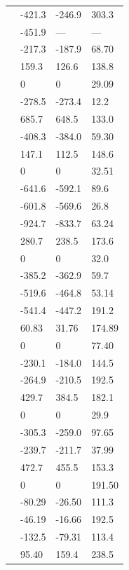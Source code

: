 \begin{supertabular}{llll}
     & -421.3 & -246.9 & 303.3 \\
     & -451.9 & --- & --- \\
     & -217.3 & -187.9 & 68.70 \\
     & 159.3 & 126.6 & 138.8 \\
     & 0 & 0 & 29.09 \\
     & -278.5 & -273.4 & 12.2 \\
     & 685.7 & 648.5 & 133.0 \\
     & -408.3 & -384.0 & 59.30 \\
     & 147.1 & 112.5 & 148.6 \\
     & 0 & 0 & 32.51 \\
     & -641.6 & -592.1 & 89.6 \\
     & -601.8 & -569.6 & 26.8 \\
     & -924.7 & -833.7 & 63.24 \\
     & 280.7 & 238.5 & 173.6 \\
     & 0 & 0 & 32.0 \\
     & -385.2 & -362.9 & 59.7 \\
     & -519.6 & -464.8 & 53.14 \\
     & -541.4 & -447.2 & 191.2 \\
     & 60.83 & 31.76 & 174.89 \\
     & 0 & 0 & 77.40 \\
     & -230.1 & -184.0 & 144.5 \\
     & -264.9 & -210.5 & 192.5 \\
     & 429.7 & 384.5 & 182.1 \\
     & 0 & 0 & 29.9 \\
     & -305.3 & -259.0 & 97.65 \\
     & -239.7 & -211.7 & 37.99 \\
     & 472.7 & 455.5 & 153.3 \\
     & 0 & 0 & 191.50 \\
     & -80.29 & -26.50 & 111.3 \\
     & -46.19 & -16.66 & 192.5 \\
     & -132.5 & -79.31 & 113.4 \\
     & 95.40 & 159.4 & 238.5 \\

\end{supertabular}
